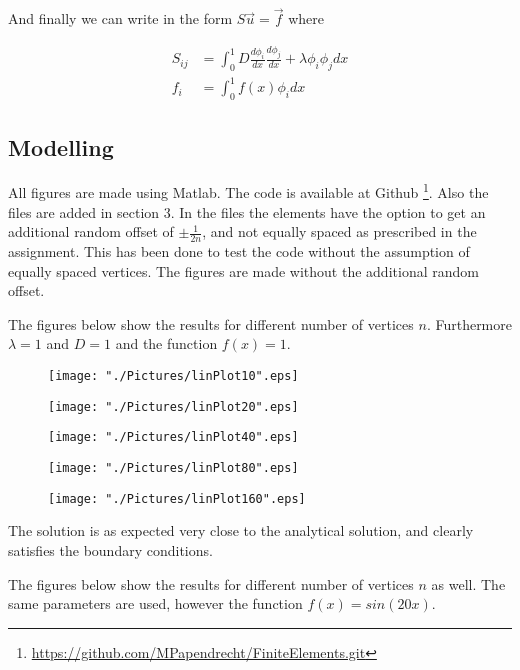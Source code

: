 \documentclass[10pt,a4paper]{article}
\begin{document}
And finally we can write in the form $S \vec{u} = \vec{f}$ where 

\begin{align}
S_{ij} &= \int_0^1 D \frac{d \phi_i}{dx} \frac{d \phi_j}{dx} + \lambda \phi_i \phi_j dx \\
f_i &= \int_0^1 f(x) \phi_i dx
\end{align}

\subsection{Modelling}
All figures are made using Matlab. 
The code is available at Github \footnote{ \label{fn:url} \url{https://github.com/MPapendrecht/FiniteElements.git}}. 
Also the files are added in section 3.
In the files the elements have the option to get an additional random offset of $\pm \frac{1}{2n}$, and not equally spaced as prescribed in the assignment. 
This has been done to test the code without the assumption of equally spaced vertices.
The figures are made without the additional random offset.

\def\scale{0.20}

The figures below show the results for different number of vertices $n$. Furthermore $\lambda = 1$ and $D = 1$ and the function $f(x)=1$.
\begin{figure}[H]
	\centering
	\texttt{[image: "./Pictures/linPlot10".eps]}
\end{figure}
\begin{figure}[H]
	\centering
	\texttt{[image: "./Pictures/linPlot20".eps]}
\end{figure}
\begin{figure}[H]
	\centering
	\texttt{[image: "./Pictures/linPlot40".eps]}
\end{figure}
\begin{figure}[H]
	\centering
	\texttt{[image: "./Pictures/linPlot80".eps]}
\end{figure}
\begin{figure}[H]
	\centering
	\texttt{[image: "./Pictures/linPlot160".eps]}
\end{figure}

The solution is as expected very close to the analytical solution, and clearly satisfies the boundary conditions. 

The figures below show the results for different number of vertices $n$ as well. The same parameters are used, however the function $f(x)=sin(20x)$.
\end{document}
